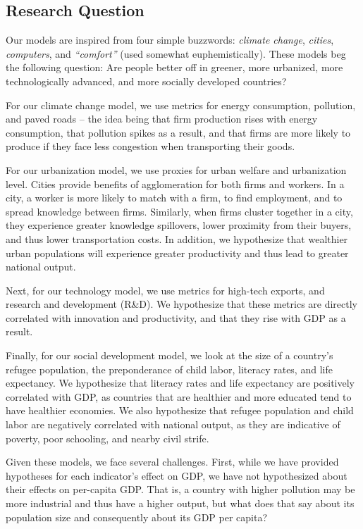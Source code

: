 \documentclass[12pt, twocolumn]{article}
\begin{document}
\subsection{Research Question}
Our models are inspired from four simple buzzwords: \emph{climate change}, \emph{cities}, \emph{computers}, and \emph{``comfort''} (used somewhat euphemistically). These models beg the following question: Are people better off in greener, more urbanized, more technologically advanced, and more socially developed countries?

For our climate change model, we use metrics for energy consumption, pollution, and paved roads -- the idea being that firm production rises with energy consumption, that pollution spikes as a result, and that firms are more likely to produce if they face less congestion when transporting their goods.

For our urbanization model, we use proxies for urban welfare and urbanization level. Cities provide benefits of agglomeration for both firms and workers. In a city, a worker is more likely to match with a firm, to find employment, and to spread knowledge between firms. Similarly, when firms cluster together in a city, they experience greater knowledge spillovers, lower proximity from their buyers, and thus lower transportation costs. In addition, we hypothesize that wealthier urban populations will experience greater productivity and thus lead to greater national output.

Next, for our technology model, we use metrics for high-tech exports, and research and development (R\&D). We hypothesize that these metrics are directly correlated with innovation and productivity, and that they rise with GDP as a result.

Finally, for our social development model, we look at the size of a country's refugee population, the preponderance of child labor, literacy rates, and life expectancy. We hypothesize that literacy rates and life expectancy are positively correlated with GDP, as countries that are healthier and more educated tend to have healthier economies. We also hypothesize that refugee population and child labor are negatively correlated with national output, as they are indicative of poverty, poor schooling, and nearby civil strife.

Given these models, we face several challenges. First, while we have provided hypotheses for each indicator's effect on GDP, we have not hypothesized about their effects on per-capita GDP. That is, a country with higher pollution may be more industrial and thus have a higher output, but what does that say about its population size and consequently about its GDP per capita?
\end{document}
